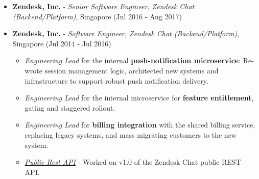 \begin{itemize}
\tightlist
\item
  \textbf{Zendesk, Inc.} - \emph{Senior Software Engineer, Zendesk Chat
  (Backend/Platform)}, Singapore \hfill (Jul 2016 - Aug 2017)
\item
  \textbf{Zendesk, Inc.} - \emph{Software Engineer, Zendesk Chat
  (Backend/Platform)}, Singapore \hfill (Jul 2014 - Jul 2016)

  \begin{itemize}
  \tightlist
  \item
    \emph{Engineering Lead} for the internal \textbf{push-notification
    microservice}: Re-wrote session management logic, architected new
    systems and infrastructure to support robust push notification
    delivery.
  \item
    \emph{Engineering Lead} for the internal microservice for
    \textbf{feature entitlement}, gating and staggered rollout.
  \item
    \emph{Engineering Lead} for \textbf{billing integration} with the
    shared billing service, replacing legacy systems, and mass migrating
    customers to the new system.
  \item
    \emph{\href{https://developer.zendesk.com/rest_api/docs/chat/introduction}{Public
    Rest API}} - Worked on v1.0 of the Zendesk Chat public REST API.


\end{itemize}
\end{itemize}
